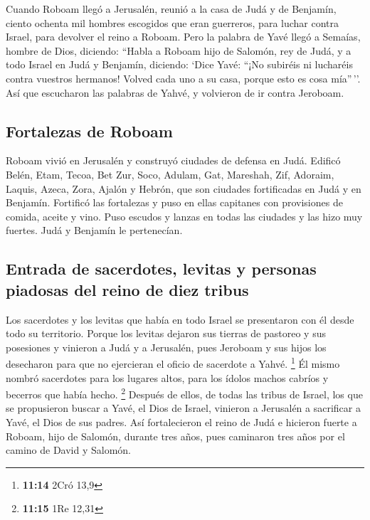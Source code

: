  Cuando Roboam llegó a Jerusalén, reunió a la casa de Judá
y de Benjamín, ciento ochenta mil hombres escogidos que eran guerreros,
para luchar contra Israel, para devolver el reino a Roboam.
 Pero la palabra de Yavé llegó a Semaías, hombre de Dios,
diciendo:  ``Habla a Roboam hijo de Salomón, rey de Judá,
y a todo Israel en Judá y Benjamín, diciendo:  `Dice Yavé:
``¡No subiréis ni lucharéis contra vuestros hermanos! Volved cada uno a
su casa, porque esto es cosa mía''\,''. Así que escucharon las palabras
de Yahvé, y volvieron de ir contra Jeroboam.

\hypertarget{fortalezas-de-roboam}{%
\subsection{Fortalezas de Roboam}\label{fortalezas-de-roboam}}

 Roboam vivió en Jerusalén y construyó ciudades de defensa
en Judá.  Edificó Belén, Etam, Tecoa,  Bet
Zur, Soco, Adulam,  Gat, Mareshah, Zif, 
Adoraim, Laquis, Azeca,  Zora, Ajalón y Hebrón, que son
ciudades fortificadas en Judá y en Benjamín.  Fortificó
las fortalezas y puso en ellas capitanes con provisiones de comida,
aceite y vino.  Puso escudos y lanzas en todas las
ciudades y las hizo muy fuertes. Judá y Benjamín le pertenecían.

\hypertarget{entrada-de-sacerdotes-levitas-y-personas-piadosas-del-reino-de-diez-tribus}{%
\subsection{Entrada de sacerdotes, levitas y personas piadosas del reino
de diez
tribus}\label{entrada-de-sacerdotes-levitas-y-personas-piadosas-del-reino-de-diez-tribus}}

 Los sacerdotes y los levitas que había en todo Israel se
presentaron con él desde todo su territorio.  Porque los
levitas dejaron sus tierras de pastoreo y sus posesiones y vinieron a
Judá y a Jerusalén, pues Jeroboam y sus hijos los desecharon para que no
ejercieran el oficio de sacerdote a Yahvé. \footnote{\textbf{11:14} 2Cró
  13,9}  Él mismo nombró sacerdotes para los lugares
altos, para los ídolos machos cabríos y becerros que había hecho.
\footnote{\textbf{11:15} 1Re 12,31}  Después de ellos, de
todas las tribus de Israel, los que se propusieron buscar a Yavé, el
Dios de Israel, vinieron a Jerusalén a sacrificar a Yavé, el Dios de sus
padres.  Así fortalecieron el reino de Judá e hicieron
fuerte a Roboam, hijo de Salomón, durante tres años, pues caminaron tres
años por el camino de David y Salomón.

